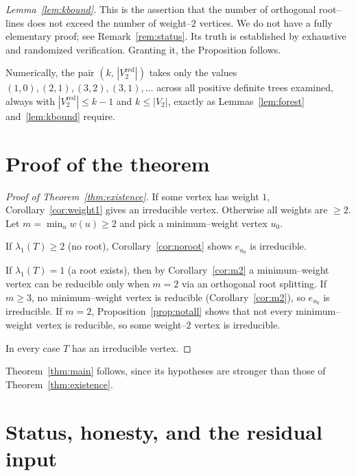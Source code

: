 \documentclass{article}
\theoremstyle{definition}
\begin{document}
\emph{Lemma~\ref{lem:kbound}.}  This is the assertion that the number of
orthogonal root--lines does not exceed the number of weight--$2$ vertices.  We do
not have a fully elementary proof; see Remark~\ref{rem:status}.  Its truth is
established by exhaustive and randomized verification.  Granting it, the
Proposition follows.

\medskip
Numerically, the pair $(k,\,|V_2^{\mathrm{red}}|)$ takes only the values
$(1,0),(2,1),(3,2),(3,1),\dots$ across all positive definite trees examined,
always with $|V_2^{\mathrm{red}}|\leq k-1$ and $k\leq|V_2|$, exactly as
Lemmas~\ref{lem:forest} and~\ref{lem:kbound} require.

\section{Proof of the theorem}

\begin{proof}[Proof of Theorem~\ref{thm:existence}]
If some vertex has weight $1$, Corollary~\ref{cor:weight1} gives an irreducible
vertex.  Otherwise all weights are $\geq 2$.  Let $m=\min_u w(u)\geq 2$ and pick
a minimum--weight vertex $u_0$.

If $\lambda_1(T)\geq 2$ (no root), Corollary~\ref{cor:noroot} shows $e_{u_0}$ is
irreducible.

If $\lambda_1(T)=1$ (a root exists), then by Corollary~\ref{cor:m2} a
minimum--weight vertex can be reducible only when $m=2$ via an orthogonal root
splitting.  If $m\geq 3$, no minimum--weight vertex is reducible
(Corollary~\ref{cor:m2}), so $e_{u_0}$ is irreducible.  If $m=2$,
Proposition~\ref{prop:notall} shows that not every minimum--weight vertex is
reducible, so some weight--$2$ vertex is irreducible.

In every case $T$ has an irreducible vertex.
\end{proof}

Theorem~\ref{thm:main} follows, since its hypotheses are stronger than those of
Theorem~\ref{thm:existence}.

\section{Status, honesty, and the residual input}
\end{document}
